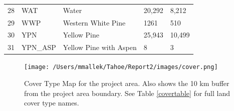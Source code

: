 \begin{table}[!htbp]
\begin{tabular}{@{}lllll@{}}
28                                                          & WAT                                                                & Water                                        & 20,292                                                  & 8,212                                                      \\
\rowcolor[HTML]{CAD6BA} 
29                                                          & WWP                                                                & Western White Pine                           & 1261                                                    & 510                                                        \\
30                                                          & YPN                                                                & Yellow Pine                                  & 25,943                                                  & 10,499                                                     \\
\rowcolor[HTML]{CAD6BA} 
31                                                          & YPN\_ASP                                                           & Yellow Pine with Aspen                       & 8                                                       & 3                                                          \\ \bottomrule
\end{tabular}
\end{table}


\begin{figure}[!htbp]
\centering
\texttt{[image: /Users/mmallek/Tahoe/Report2/images/cover.png]}
\caption{Cover Type Map for the project area. Also shows the 10 km buffer from the project area boundary. See Table \ref{covertable} for full land cover type names.} 
\label{covermap}
\end{figure}

